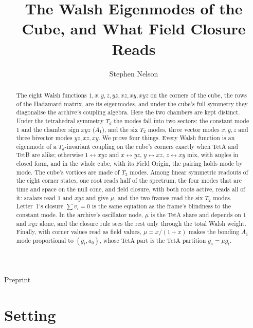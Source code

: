 \documentclass[twocolumn]{iopjournal}
\renewcommand{\articletype}[1]{%
  {\vspace*{-8mm}\noindent \Large \sf Preprint}\par
  \vspace*{6mm}\noindent{\scriptsize \sf{\bfseries \MakeUppercase{#1}}}}
\theoremstyle{definition}
\theoremstyle{remark}
\begin{document}
\articletype{Proof}

\title{The Walsh Eigenmodes of the Cube, and What Field Closure Reads}

\author{Stephen Nelson}



\begin{abstract}
The eight Walsh functions $1, x, y, z, yz, xz, xy, xyz$ on the corners of
the cube, the rows of the Hadamard matrix, are its eigenmodes, and under
the cube's full symmetry they diagonalise the archive's coupling
algebra. Here the two chambers are kept distinct. Under the tetrahedral
symmetry $T_d$ the modes fall into two sectors: the constant mode $1$ and
the chamber sign $xyz$ ($A_1$), and the six $T_2$ modes, three vector
modes $x, y, z$ and three bivector modes $yz, xz, xy$. We prove four
things. Every Walsh function is an eigenmode of a $T_d$-invariant coupling
on the cube's corners exactly when TetA and TetB are alike; otherwise $1
\leftrightarrow xyz$ and $x \leftrightarrow yz$, $y \leftrightarrow xz$, $z
\leftrightarrow xy$ mix, with angles in closed form, and in the whole
cube, with its Field Origin, the pairing holds mode by mode. The cube's
vortices are made of $T_2$ modes. Among linear symmetric readouts of the eight corner states, one
root reads half of the spectrum, the four modes that are time and space on
the null cone, and field closure, with both roots active, reads all of it:
scalars read $1$ and $xyz$ and give $\mu$, and the two frames read the six
$T_2$ modes. Letter~1's closure $\sum v_i = 0$ is the same equation as the
frame's blindness to the constant mode. In the archive's oscillator node,
$\mu$ is the TetA share and depends on $1$ and $xyz$ alone, and the
closure rule sees the rest only through the total Walsh weight. Finally,
with corner values read as field values, $\mu = x/(1+x)$ makes the bonding
$A_1$ mode proportional to $(g_t, a_0)$, whose TetA part is the TetA
partition $g_s = \mu g_t$.
\end{abstract}



\section*{Setting}
\end{document}
